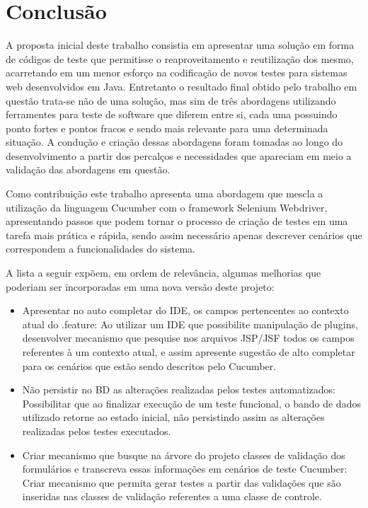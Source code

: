 \documentclass[tg]{mdtufsm}
\begin{document}
\chapter{Conclusão}
A proposta inicial deste trabalho consistia em apresentar uma solução em forma de códigos de teste que permitisse o reaproveitamento e reutilização dos mesmo, acarretando em um menor esforço na codificação de novos testes para sistemas web desenvolvidos em Java. Entretanto o resultado final obtido pelo trabalho em questão trata-se não de uma solução, mas sim de três abordagens utilizando ferramentes para teste de software que diferem entre si, cada uma possuindo ponto fortes e pontos fracos e sendo mais relevante para uma determinada situação. A condução e criação dessas abordagens foram tomadas ao longo do desenvolvimento a partir dos percalços e necessidades que apareciam em meio a validação das abordagens em questão.

Como contribuição este trabalho apresenta uma abordagem que mescla a utilização da linguagem Cucumber com o framework Selenium Webdriver, apresentando passos que podem tornar o processo de criação de testes em uma tarefa mais prática e rápida, sendo assim necessário apenas descrever cenários que correspondem a funcionalidades do sistema.

A lista a seguir expõem, em ordem de relevância, algumas melhorias que poderiam ser incorporadas em uma nova versão deste projeto:

\begin{itemize}
	\item Apresentar no auto completar do IDE, os campos pertencentes ao contexto atual do .feature: Ao utilizar um IDE que possibilite manipulação de plugins, desenvolver mecanismo que pesquise nos arquivos JSP/JSF todos os campos referentes à um contexto atual, e assim apresente sugestão de alto completar para os cenários que estão sendo descritos pelo Cucumber.
	\item Não persistir no BD as alterações realizadas pelos testes automatizados: Possibilitar que ao finalizar execução de um teste funcional, o bando de dados utilizado retorne ao estado inicial, não persistindo assim as alterações realizadas pelos testes executados.
	\item Criar mecanismo que busque na árvore do projeto classes de validação dos formulários e transcreva essas informações em cenários de teste Cucumber: Criar mecanismo que permita gerar testes a partir das validações que são inseridas nas classes de validação referentes a uma classe de controle.
\end{itemize}

\setlength{\baselineskip}{\baselineskip}


\end{document}
